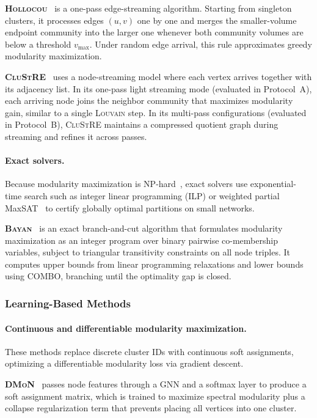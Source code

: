 \documentclass[11pt,a4paper]{article}
\begin{document}
\textbf{\textsc{Hollocou}}~\cite{hollocou2017} is a one-pass edge-streaming algorithm. Starting from singleton clusters, it processes edges $(u,v)$ one by one and merges the smaller-volume endpoint community into the larger one whenever both community volumes are below a threshold $v_{\max}$. Under random edge arrival, this rule approximates greedy modularity maximization.

\textbf{\textsc{CluStRE}}~\cite{clustre2025} uses a node-streaming model where each vertex arrives together with its adjacency list. In its one-pass light streaming mode (evaluated in Protocol~A), each arriving node joins the neighbor community that maximizes modularity gain, similar to a single \textsc{Louvain} step. In its multi-pass configurations (evaluated in Protocol~B), \textsc{CluStRE} maintains a compressed quotient graph during streaming and refines it across passes.

\paragraph*{\textbf{Exact solvers.}}
Because modularity maximization is NP-hard~\cite{Brandes2008}, exact solvers use exponential-time search such as integer linear programming (ILP) or weighted partial MaxSAT~\cite{maxsat2025} to certify globally optimal partitions on small networks.

\textbf{\textsc{Bayan}}~\cite{bayan2024} is an exact branch-and-cut algorithm that formulates modularity maximization as an integer program over binary pairwise co-membership variables, subject to triangular transitivity constraints on all node triples. It computes upper bounds from linear programming relaxations and lower bounds using \textsc{COMBO}, branching until the optimality gap is closed.

\subsubsection{Learning-Based Methods}

\paragraph*{\textbf{Continuous and differentiable modularity maximization.}}
These methods replace discrete cluster IDs with continuous soft assignments, optimizing a differentiable modularity loss via gradient descent.

\textbf{\textsc{DMoN}}~\cite{dmon2023} passes node features through a GNN and a softmax layer to produce a soft assignment matrix, which is trained to maximize spectral modularity plus a collapse regularization term that prevents placing all vertices into one cluster.
\end{document}
